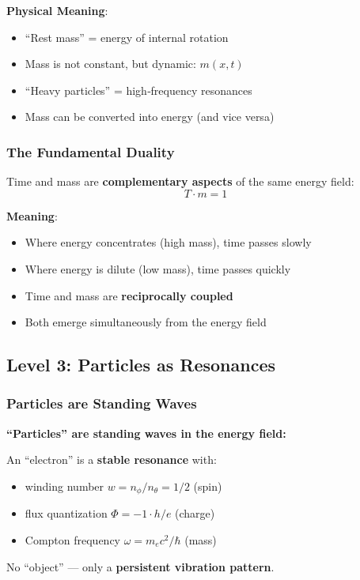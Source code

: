 	\textbf{Physical Meaning}:
	\begin{itemize}
		\item \enquote{Rest mass} = energy of internal rotation
		\item Mass is not constant, but dynamic: $m(x,t)$
		\item \enquote{Heavy particles} = high‑frequency resonances
		\item Mass can be converted into energy (and vice versa)
	\end{itemize}

	\subsubsection{The Fundamental Duality}

	Time and mass are \textbf{complementary aspects} of the same energy field:
	\begin{equation}
		\boxed{T \cdot m = 1}
	\end{equation}

	\textbf{Meaning}:
	\begin{itemize}
		\item Where energy concentrates (high mass), time passes slowly
		\item Where energy is dilute (low mass), time passes quickly
		\item Time and mass are \textbf{reciprocally coupled}
		\item Both emerge simultaneously from the energy field
	\end{itemize}

	\subsection{Level 3: Particles as Resonances}

	\subsubsection{Particles are Standing Waves}

	\begin{keyresult}
		\textbf{\enquote{Particles} are standing waves in the energy field:}

		\vspace{0.3cm}

		An \enquote{electron} is a \textbf{stable resonance} with:
		\begin{itemize}
			\item winding number $w = n_\phi/n_\theta = 1/2$ (spin)
			\item flux quantization $\Phi = -1 \cdot h/e$ (charge)
			\item Compton frequency $\omega = m_e c^2 / \hbar$ (mass)
		\end{itemize}

		\vspace{0.3cm}

		No \enquote{object} — only a \textbf{persistent vibration pattern}.
	\end{keyresult}

